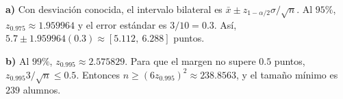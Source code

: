 \textbf{a)} Con desviación conocida, el intervalo bilateral
es $\bar x\pm z_{1-\alpha/2}\sigma/\sqrt n$.
Al $95\%$, $z_{0.975}\approx1.959964$ y el error estándar
es $3/10=0.3$. Así,
$5.7\pm1.959964(0.3)\approx\boxed{[5.112,\ 6.288]}$ puntos.

\textbf{b)} Al $99\%$, $z_{0.995}\approx2.575829$.
Para que el margen no supere $0.5$ puntos,
$z_{0.995}3/\sqrt n\le0.5$. Entonces
$n\ge(6z_{0.995})^2\approx238.8563$, y el tamaño mínimo
es $\boxed{239}$ alumnos.
